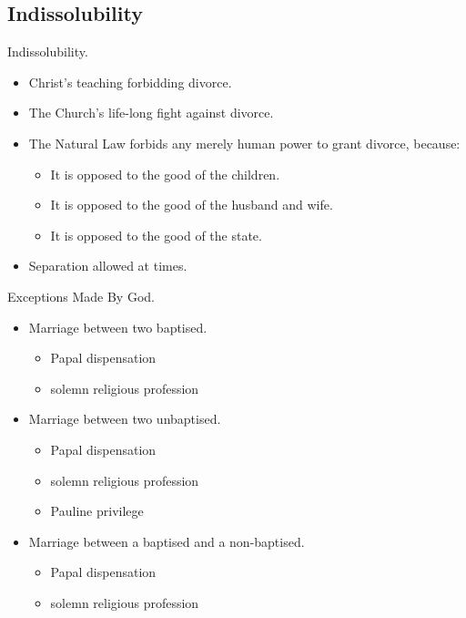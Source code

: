 \documentclass{beamer}
\begin{document}
\subsection{Indissolubility}

\begin{frame}{Indissolubility.}
\begin{itemize}
 \item   Christ's teaching forbidding divorce.
 \item   The Church's life-long fight against divorce.
 \item   The Natural Law forbids any merely human power to  grant  divorce,
    because: 
\begin{itemize}
    \item It is opposed to the good of the children.
    \item It is opposed to the good of the husband and wife.
    \item It is opposed to the good of the state.
\end{itemize}
 \item  Separation allowed at times.
\end{itemize}
\end{frame}

\begin{frame}{Exceptions Made By God.}
\begin{itemize}
 \item   Marriage between two baptised.
\begin{itemize}
\item Papal dispensation
\item solemn religious profession
\end{itemize}
 \item   Marriage between two unbaptised.
\begin{itemize}
\item Papal dispensation
\item solemn religious profession
\item Pauline privilege
\end{itemize}
 \item   Marriage between a baptised and a non-baptised.
\begin{itemize}
\item Papal dispensation
\item solemn religious profession
\end{itemize}
\end{itemize}
\end{frame}
\end{document}
